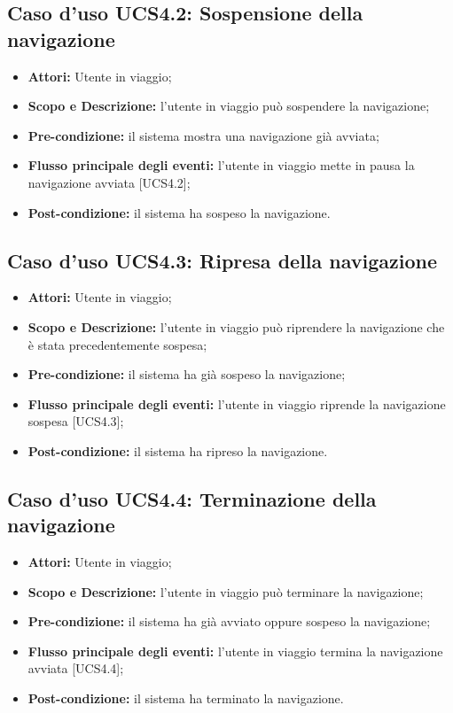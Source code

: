 \subsection{Caso d'uso UCS4.2: Sospensione della navigazione}
\begin{itemize}
\item \textbf{Attori:} Utente in viaggio;
\item \textbf{Scopo e Descrizione:} l'utente in viaggio può sospendere la navigazione;
\item \textbf{Pre-condizione:} il sistema mostra una navigazione già avviata;
\item \textbf{Flusso principale degli eventi:} l'utente in viaggio mette in pausa la navigazione avviata [UCS4.2];
\item \textbf{Post-condizione:} il sistema ha sospeso la navigazione.
\end{itemize}

\subsection{Caso d'uso UCS4.3: Ripresa della navigazione}
\begin{itemize}
\item \textbf{Attori:} Utente in viaggio;
\item \textbf{Scopo e Descrizione:} l'utente in viaggio può riprendere la navigazione che è stata precedentemente sospesa;
\item \textbf{Pre-condizione:} il sistema ha già sospeso la navigazione;
\item \textbf{Flusso principale degli eventi:} l'utente in viaggio riprende la navigazione sospesa [UCS4.3];
\item \textbf{Post-condizione:} il sistema ha ripreso la navigazione.
\end{itemize}


\subsection{Caso d'uso UCS4.4: Terminazione della navigazione}
\begin{itemize}
\item \textbf{Attori:} Utente in viaggio;
\item \textbf{Scopo e Descrizione:} l'utente in viaggio può terminare la navigazione;
\item \textbf{Pre-condizione:} il sistema ha già avviato oppure sospeso la navigazione;
\item \textbf{Flusso principale degli eventi:} l'utente in viaggio termina la navigazione avviata [UCS4.4];
\item \textbf{Post-condizione:} il sistema ha terminato la navigazione.
\end{itemize}

